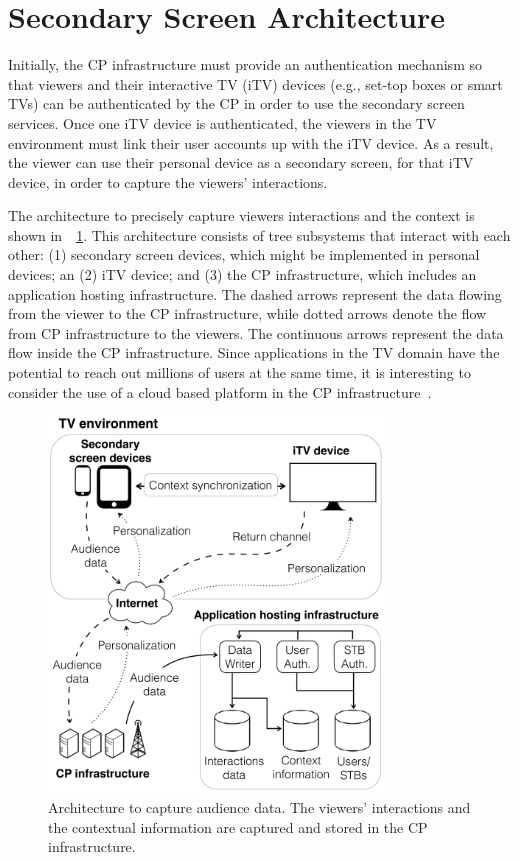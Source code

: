 \documentclass[journal]{IEEEtran}
\begin{document}
\section{Secondary Screen Architecture}

Initially, the CP infrastructure must provide an authentication mechanism so that viewers and their interactive TV (iTV) devices (e.g., set-top boxes or smart TVs) can be authenticated by the CP in order to use the secondary screen services. Once one iTV device is authenticated, the viewers in the TV environment must link their user accounts up with the iTV device. As a result, the viewer can use their personal device as a secondary screen, for that iTV device, in order to capture the viewers' interactions.

The architecture to precisely capture viewers interactions and the context is shown in~\figurename~\ref{fig_architecture}. This architecture consists of tree subsystems that interact with each other: (1) secondary screen devices, which might be implemented in personal devices; an (2) iTV device; and (3) the CP infrastructure, which includes an application hosting infrastructure. The dashed arrows represent the data flowing from the viewer to the CP infrastructure, while dotted arrows denote the flow from CP infrastructure to the viewers. The continuous arrows represent the data flow inside the CP infrastructure. Since applications in the TV domain have the potential to reach out millions of users at the same time, it is interesting to consider the use of a cloud based platform in the CP infrastructure~\cite{Lee2010}. 

\begin{figure}[!t]
	\centering
	\includegraphics[width=3.5in]{img/architecture.pdf}
	\caption{Architecture to capture audience data. The viewers' interactions and the contextual information are captured and stored in the CP infrastructure.}
	\label{fig_architecture}
\end{figure}
\end{document}
